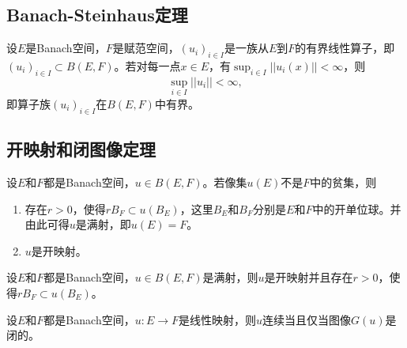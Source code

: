 \begin{lemma}
    
\end{lemma}

\subsection{Banach-Steinhaus定理}

\begin{theorem}
    设$E$是Banach空间，$F$是赋范空间，$(u_i)_{i\in I}$是一族从$E$到$F$的有界线性算子，即$(u_i)_{i\in I}\subset B(E,F)$。若对每一点$x\in E$，有$\sup _{i\in I}||u_i(x)||<\infty $，则
    \begin{equation*}
        \sup_{i\in I}||u_i||<\infty , 
    \end{equation*}
    即算子族$(u_i)_{i\in I}$在$B(E,F)$中有界。       
\end{theorem}

\subsection{开映射和闭图像定理}

\begin{theorem}[(开映射定理)]
    设$E$和$F$都是Banach空间，$u\in B(E,F)$。若像集$u(E)$不是$F$中的贫集，则
    \begin{enumerate}
        \item 存在$r>0$，使得$rB_F\subset u(B_E)$，这里$B_E$和$B_F$分别是$E$和$F$中的开单位球。并由此可得$u$是满射，即$u(E)=F$。
        \item $u$是开映射。
    \end{enumerate}
\end{theorem}

\begin{corollary}[(开映射定理)]
    设$E$和$F$都是Banach空间，$u\in B(E,F)$是满射，则$u$是开映射并且存在$r>0$，使得$rB_F\subset u(B_E)$。
\end{corollary}

\begin{theorem}[(闭图像定理)]
    设$E$和$F$都是Banach空间，$u:E\rightarrow F$是线性映射，则$u$连续当且仅当图像$G(u)$是闭的。
\end{theorem}